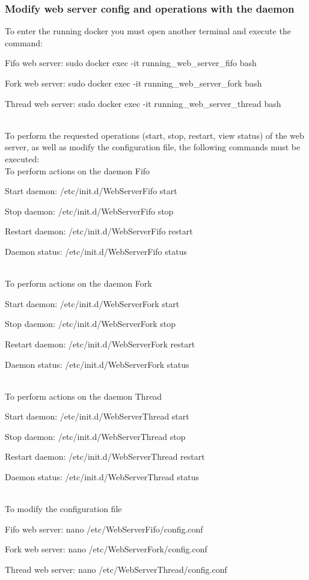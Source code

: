 \documentclass{article}
\begin{document}
\subsubsection{Modify web server config and operations with the daemon}
To enter the running docker you must open another terminal and execute the command:\\ 
\newline
\centerline{Fifo web server: sudo docker exec -it running\_web\_server\_fifo bash}	
\centerline{Fork web server: sudo docker exec -it running\_web\_server\_fork bash}
\centerline{Thread web server: sudo docker exec -it running\_web\_server\_thread bash}
\newline\\
To perform the requested operations (start, stop, restart, view status) of the web server, as well as modify the configuration file, the following commands must be executed:\\
\newline
To perform actions on the daemon Fifo\\
\newline
\centerline{Start daemon: /etc/init.d/WebServerFifo start}
\centerline{Stop daemon: /etc/init.d/WebServerFifo stop}
\centerline{Restart daemon: /etc/init.d/WebServerFifo restart}
\centerline{Daemon status: /etc/init.d/WebServerFifo status}
\newline\\
To perform actions on the daemon Fork\\
\newline
\centerline{Start daemon: /etc/init.d/WebServerFork start}
\centerline{Stop daemon: /etc/init.d/WebServerFork stop}
\centerline{Restart daemon: /etc/init.d/WebServerFork restart}
\centerline{Daemon status: /etc/init.d/WebServerFork status}
\newline\\
To perform actions on the daemon Thread\\
\newline
\centerline{Start daemon: /etc/init.d/WebServerThread start}
\centerline{Stop daemon: /etc/init.d/WebServerThread stop}
\centerline{Restart daemon: /etc/init.d/WebServerThread restart}
\centerline{Daemon status: /etc/init.d/WebServerThread status}
\newline\\
To modify the configuration file\\
\newline
\centerline{Fifo web server: nano /etc/WebServerFifo/config.conf}
\centerline{Fork web server: nano /etc/WebServerFork/config.conf}
\centerline{Thread web server: nano /etc/WebServerThread/config.conf}
\end{document}
